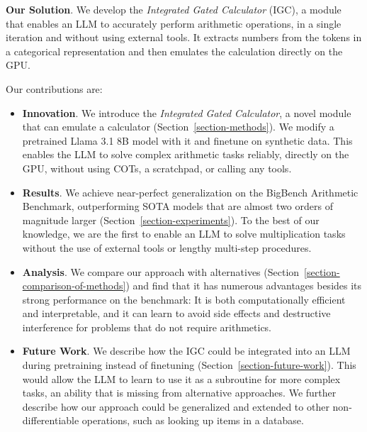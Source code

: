 \documentclass[11pt]{article}
\begin{document}
\textbf{Our Solution}.
We develop the \textit{Integrated Gated Calculator} (IGC), a module that enables an LLM to accurately perform arithmetic operations, in a single iteration and without using external tools.
It extracts numbers from the tokens in a categorical representation and then emulates the calculation directly on the GPU.


Our contributions are:

\begin{itemize}
    \item \textbf{Innovation}.
    We introduce the \textit{Integrated Gated Calculator}, a novel module that can emulate a calculator (Section~\ref{section-methods}).
    We modify a pretrained Llama 3.1 8B model \citep{touvron2023llama,dubey2024llama} with it and finetune on synthetic data. This enables the LLM to solve complex arithmetic tasks reliably, directly on the GPU, without using COTs, a scratchpad, or calling any tools.
    \item \textbf{Results}.
    We achieve near-perfect generalization on the BigBench Arithmetic Benchmark, outperforming SOTA models that are almost two orders of magnitude larger (Section~\ref{section-experiments}).
    To the best of our knowledge, we are the first to enable an LLM to solve multiplication tasks without the use of external tools or lengthy multi-step procedures.
    \item \textbf{Analysis}.
    We compare our approach with alternatives (Section~\ref{section-comparison-of-methods}) and find that it has numerous advantages besides its strong performance on the benchmark: It is both computationally efficient and interpretable, and it can learn to avoid side effects and destructive interference for problems that do not require arithmetics.
    \item \textbf{Future Work}.
    We describe how the IGC could be integrated into an LLM during pretraining instead of finetuning (Section~\ref{section-future-work}). This would allow the LLM to learn to use it as a subroutine for more complex tasks, an ability that is missing from alternative approaches.
    We further describe how our approach could be generalized and extended to other non-differentiable operations, such as looking up items in a database.
\end{itemize}
\end{document}
